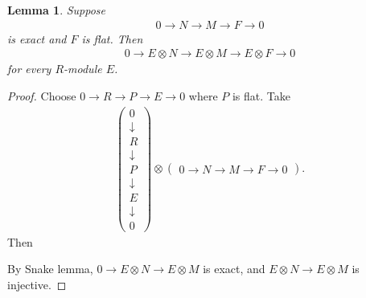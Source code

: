 \documentclass[12pt]{report}
\theoremstyle{plain}
\newtheorem{lemma}[theorem]{Lemma}
\theoremstyle{remark}
\theoremstyle{definition}
\begin{document}
\begin{lemma}
    Suppose
    \begin{align*}
        0\to N\to M\to F\to 0
    \end{align*}
    is exact and $F$ is flat. Then
    \begin{align*}
        0\to E\otimes N\to E\otimes M\to E\otimes F\to 0
    \end{align*}
    for every $R$-module $E$.
\end{lemma}
\begin{proof}
    Choose $0\to R\to P\to E\to 0$ where $P$ is flat. Take
    \begin{align*}
        \begin{pmatrix}
            0 \\ \downarrow \\ R \\ \downarrow \\ P \\ \downarrow \\ E \\ \downarrow \\ 0
        \end{pmatrix} \otimes \begin{pmatrix}
            0\to N\to M\to F\to 0
        \end{pmatrix}.
    \end{align*}
    Then
    \begin{figure}[H]
        \centering
    \end{figure}
    \noindent By Snake lemma, $0\to E\otimes N\to E\otimes M$ is exact, and $E\otimes N\to E\otimes M$ is injective.
\end{proof}
\end{document}
